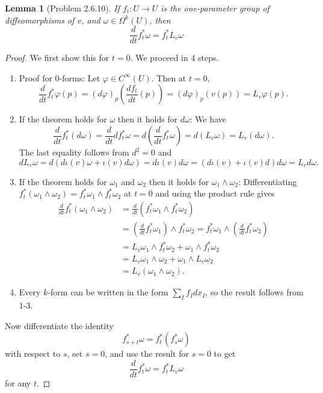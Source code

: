 \documentclass[12pt]{article}
\theoremstyle{norm}
\newtheorem{lem}[thm]{Lemma}
\newcommand{\ph}[0]{\varphi}
\newcommand{\om}[0]{\omega}
\newcommand{\Om}[0]{\Omega}
\newcommand{\pa}[1]{\left( {#1} \right)}
\newcommand{\iy}[0]{\infty}
\begin{document}
\begin{lem}[Problem 2.6.10]
If $f_t:U\to U$ is the one-parameter group of diffeomorphisms of $v$, and $\om\in \Om^k(U)$, then
\[
\frac{d}{dt} f_t^* \om
= f_t^*L_{v}\om
\]
\end{lem}
\begin{proof}
We first show this for $t=0$. We proceed in 4 steps.
\begin{enumerate}
\item Proof for 0-forms: Let $\ph\in C^{\iy}(U)$. Then at $t=0$,
\[
\frac{d}{dt}f_t^*\ph(p)=(d\ph)_p\pa{\frac{df_t}{dt}(p)}=(d\ph)_p(v(p))=L_v\ph(p).
\]
\item If the theorem holds for $\om$ then it holds for $d\om$: We have
\[
\frac{d}{dt} f_t^*(d\om)=\frac{d}{dt}df_t^*\om =d\pa{\frac{d}{dt} f_t^* \om}=d(L_v\om)=L_v(d\om).\]
The last equality follows from $d^2=0$ and
\[
dL_v \om=d(d\iota(v)\om+\iota(v)d\om)=d\iota(v)d\om =(d\iota(v)+\iota(v)d)d\om=L_vd\om.
\]
\item If the theorem holds for $\om_1$ and $\om_2$ then it holds for $\om_1\wedge \om_2$: Differentiating $f_t^*(\om_1\wedge \om_2)=f_t^*\om_1\wedge f_t^*\om_2$ at $t=0$ and using the product rule gives
\begin{align*}
\frac{d}{dt}f_t^*(\om_1\wedge \om_2)&=\frac{d}{dt}(f_t^*\om_1\wedge f_t^*\om_2)\\
&=\pa{\frac{d}{dt} f_t^* \om_1}\wedge f_t^*\om_2=f_t^*\om_1\wedge \pa{\frac{d}{dt}f_t^*\om_2}\\
&=L_v\om_1 \wedge f_t^*\om_2+\om_1\wedge f_t^*\om_2\\
&=L_v\om_1 \wedge \om_2+\om_1\wedge L_v\om_2\\
&=L_v(\om_1\wedge \om_2).
\end{align*}

\item Every $k$-form can be written in the form $\sum_I f_Idx_I$, so the result follows from 1-3.
\end{enumerate}
Now differentiate the identity
\[
f_{s+t}^* \om=f_t^*(f_s^*\om)
\]
with respect to $s$, set $s=0$, and use the result for $s=0$ to get
\[
\frac{d}{dt}f_t^*\om=f_t^*L_v\om
\]
for any $t$.
\end{proof}
\end{document}
